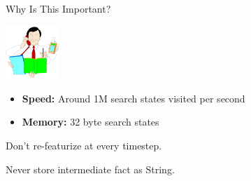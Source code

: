 \def\title{Why Is This Important?}
\begin{frame}{\title}
\begin{center}
\includegraphics[height=2cm]{../img/efficient.png}
\end{center}

\begin{itemize}
\item \textbf{Speed:} Around 1M search states visited per second
\item \textbf{Memory:} 32 byte search states
\end{itemize}
\vspace{2ex}
\pause

 Don't re-featurize at every timestep.
\vspace{2ex}
\pause

 Never store intermediate fact as String.
\end{frame}



